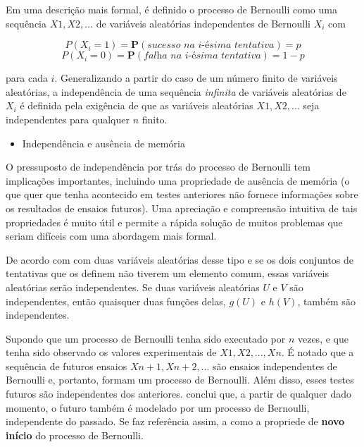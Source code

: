 Em uma descrição mais formal, é definido o processo de Bernoulli como uma sequência $X1, X2, \dots$ de variáveis aleatórias independentes de Bernoulli $X_{i}$ com

$$P(X_{i} = 1) = \textbf{P}(\textit{sucesso na i-ésima tentativa}) = p $$
$$P(X_{i} = 0) = \textbf{P}(\textit{falha na i-ésima tentativa}) = 1-p $$


para cada $i$. Generalizando a partir do caso de um número finito de variáveis aleatórias, a independência de uma sequência \textit{infinita} de variáveis aleatórias de $X_i$ é definida pela exigência de que as variáveis aleatórias $X1, X2, \dots$ seja independentes para qualquer $n$ finito.


\begin{itemize}
	\item Independência e ausência de memória
\end{itemize}

O pressuposto de independência por trás do processo de Bernoulli tem implicações importantes, incluindo uma propriedade de ausência de memória (o que quer que tenha acontecido em testes anteriores não fornece informações sobre os resultados de ensaios futuros). Uma apreciação e compreensão intuitiva de tais propriedades é muito útil e permite a rápida solução de muitos problemas que seriam difíceis com uma abordagem mais formal.

De acordo com \cite{bertsekas2008} com duas variáveis aleatórias desse tipo e se os dois conjuntos de tentativas que os definem não tiverem um elemento comum, essas variáveis aleatórias serão independentes. Se duas variáveis aleatórias $U$ e $V$ são independentes, então quaisquer duas funções delas, $g(U)$ e $h(V)$, também são independentes.

Supondo que um processo de Bernoulli tenha sido executado por $n$ vezes, e que tenha sido observado os valores experimentais de $X1, X2, ..., Xn$. É notado que a sequência de futuros ensaios $Xn + 1, Xn + 2, ...$ são ensaios independentes de Bernoulli e, portanto, formam um processo de Bernoulli. Além disso, esses testes futuros são independentes dos anteriores. \cite{bertsekas2008} conclui que, a partir de qualquer dado momento, o futuro também é modelado por um processo de Bernoulli, independente do passado. Se faz referência assim, a como a propriede de \textbf{novo início} do processo de Bernoulli.



